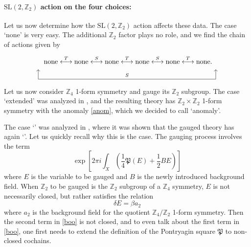 \documentclass[12pt]{article}
\numberwithin{equation}{section}
\def\bZ{\mathbb{Z}}
\def\fP{\mathfrak{P}}
\def\SL{\mathrm{SL}}
\begin{document}
\paragraph{$\SL(2,\bZ_2)$ action on the four choices:}
Let us now determine how the $\SL(2,\bZ_2)$ action affects these data.
The case `none' is very easy.
The additional $\bZ_2$ factor plays no role, and we find the chain of actions given by \begin{equation}
\begin{tikzpicture}
	\node at (0,0) {$
		\text{none} \stackrel{T}{\longleftrightarrow} 
		\text{none} \stackrel{S}{\longleftrightarrow} 
		\text{none} \stackrel{T}{\longleftrightarrow} 
		\text{none} \stackrel{S}{\longleftrightarrow} 
		\text{none} \stackrel{T}{\longleftrightarrow} 
		\text{none}.
	$};
	\draw[->] (-4.6,-1) -- (-4.6,-0.5);
	\draw[->] (4.5,-1) -- (4.5,-0.5);
	\draw (-4.6,-1) -- node[above] {\scriptsize $S$} (4.5,-1);
\end{tikzpicture}
\label{trivial-chain}
\end{equation}

Let us now consider $\bZ_4$ 1-form symmetry and gauge its $\bZ_2$ subgroup.
The case  `extended' was analyzed in \cite{Tachikawa:2017gyf},
and the resulting theory has $\bZ_2\times \bZ_2$ 1-form symmetry with the anomaly \eqref{anom}, 
which we decided to call `anomaly'.

The case `\Textended' was analyzed in \cite{Hsin:2020nts},
where it was shown that the gauged theory has again `\Textended'.
Let us quickly recall why this is the case. 
The gauging process involves the term
 \begin{equation}
\exp\left[2\pi i\int_X \left( \frac14 \fP(E) +\frac12 B E\right)\right]
\label{boo}
\end{equation}
where $E$ is the variable to be gauged and $B$ is the newly introduced background field.
When $\bZ_2$ to be gauged is the $\bZ_2$ subgroup of a $\bZ_4$ symmetry,
$E$ is not necessarily closed, but rather satisfies the relation \begin{equation}
\delta E = \beta a_2
\end{equation}
where $a_2$ is the background field for the quotient $\bZ_4/\bZ_2$ 1-form symmetry.
Then the second term in \eqref{boo} is not closed, 
and to even talk about the first term in \eqref{boo}, one first needs to extend the definition of the Pontryagin square $\fP$ to non-closed cochains.
\end{document}
